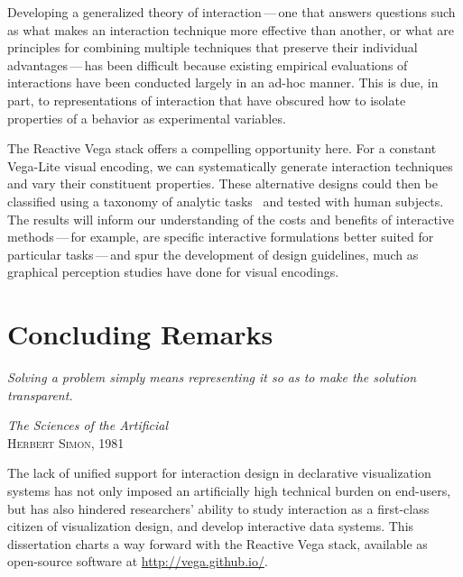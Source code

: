 Developing a generalized theory of interaction\,---\,one that answers questions
such as what makes an interaction technique more effective than another, or what
are principles for combining multiple techniques that preserve their individual
advantages\,---\,has been difficult because existing empirical evaluations of
interactions have been conducted largely in an ad-hoc manner. This is due, in
part, to representations of interaction that have obscured how to isolate
properties of a behavior as experimental variables.

The Reactive Vega stack offers a compelling opportunity here. For a constant
Vega-Lite visual encoding, we can systematically generate interaction techniques
and vary their constituent properties. These alternative designs could then be
classified using a taxonomy of analytic tasks~\cite{brehmer:taxonomy} and tested
with human subjects. The results will inform our understanding of the costs and
benefits of interactive methods\,---\,for example, are specific interactive
formulations better suited for particular tasks\,---\,and spur the development
of design guidelines, much as graphical perception studies have done for visual
encodings.

\vspace{-10pt}

\section{Concluding Remarks}

\vspace{-10pt}

\setlength{}
\epigraph{\textit{Solving a problem simply means representing it so as to make
the solution transparent.}} {\textit{The Sciences of the
Artificial}\\\textsc{Herbert Simon, 1981}}

The lack of unified support for interaction design in declarative visualization
systems has not only imposed an artificially high technical burden on end-users,
but has also hindered researchers' ability to study interaction as a first-class
citizen of visualization design, and develop interactive data systems. This
dissertation charts a way forward with the Reactive Vega stack, available as
open-source software at \url{http://vega.github.io/}.